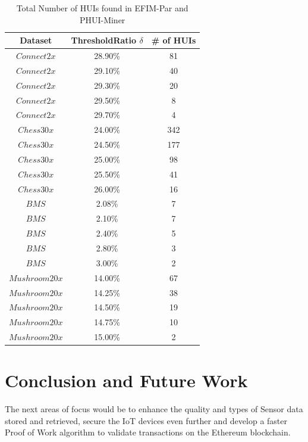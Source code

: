\documentclass[11pt,openright]{report}
\begin{document}
\begin{table}
	\renewcommand{\arraystretch}{1.3}
	\caption{Total Number of HUIs found in EFIM-Par and PHUI-Miner}
	\label{table:result-huis-distributed}
	\centering
	\begin{tabular}{|c||c|c|}
		\hline
		\bfseries Dataset & \bfseries ThresholdRatio $\delta$ & \bfseries \# of HUIs\\
		\hline\hline
		$Connect2x$ & 28.90\% & 81\\ \hline
		$Connect2x$ & 29.10\% & 40\\ \hline
		$Connect2x$ & 29.30\% & 20\\ \hline
		$Connect2x$ & 29.50\% & 8\\ \hline
		$Connect2x$ & 29.70\% & 4\\ \hline \hline
		
		$Chess30x$ & 24.00\% & 342\\ \hline
		$Chess30x$ & 24.50\% & 177\\ \hline
		$Chess30x$ & 25.00\% & 98\\ \hline
		$Chess30x$ & 25.50\% & 41\\ \hline
		$Chess30x$ & 26.00\% & 16\\ \hline \hline
		
		$BMS$ & 2.08\% & 7\\ \hline
		$BMS$ & 2.10\% & 7\\ \hline
		$BMS$ & 2.40\% & 5\\ \hline
		$BMS$ & 2.80\% & 3\\ \hline
		$BMS$ & 3.00\% & 2\\ \hline
		
		$Mushroom20x$ & 14.00\% & 67\\ \hline
		$Mushroom20x$ & 14.25\% & 38\\ \hline
		$Mushroom20x$ & 14.50\% & 19\\ \hline
		$Mushroom20x$ & 14.75\% & 10\\ \hline
		$Mushroom20x$ & 15.00\% & 2\\ \hline
		
	\end{tabular}
\end{table}


\chapter{Conclusion and Future Work} \label{chapter:conclusion}
The next areas of focus would be to enhance the quality and types of Sensor data stored and retrieved, secure the IoT devices even further and develop a faster Proof of Work algorithm to validate transactions on the Ethereum blockchain. 
\end{document}
